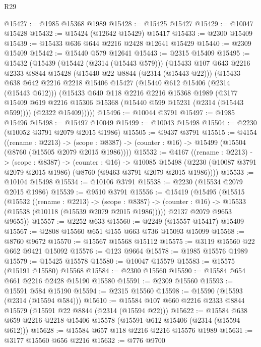 \begin{lexlean}{R29}
\begin{coremodule}
@15427 := @1985 @15368 @1989
@15428 := @15425 @15427
@15429 := @10047 @15428
@15432 := @15424 (@12642 @15429) @15417
@15433 := @2300 @15409
@15439 := @15433 @636 @644 @2216 @2428 @12641 @15429
@15440 := @2309 @15409
@15442 := @15440 @579 @12641
@15443 := @2315 @15409
@15495 := @15432
    (@15439
      (@15442 (@2314 (@15443 @579)))
      (@15433
        @107
        @643
        @2216
        @2333
        @8844
        @15428
        (@15440 @22 @8844 (@2314 (@15443 @22)))
        (@15433
          @638
          @642
          @2216
          @2218
          @15406
          @15427
          (@15440 @612 @15406 (@2314 (@15443 @612)))
          (@15433
            @640
            @118
            @2216
            @2216
            @15368
            @1989
            (@3177 @15409 @619 @2216 @15306 @15368 (@15440 @599 @15231 (@2314 (@15443 @599))))
            (@2322 @15409)))))
@15496 := @10044 @3791
@15497 := @1985 @15496
@15498 := @15497 @10049
@15499 := @10043 @15498
@15504 := @2230 (@10052 @3791 @2079 @2015 @1986)
@15505 := @9437 @3791
@15515 := @4154
    ((rename : @2213) ->
    (scope : @8387) -> (counter : @16) -> @15499 (@15504 (@8760 (@15505 @2079 @2015 @1986))))
@15532 := @4167
    ((rename : @2213) ->
    (scope : @8387) ->
    (counter : @16) ->
    @10085 @15498 (@2230 (@10087 @3791 @2079 @2015 @1986) (@8760 (@9463 @3791 @2079 @2015 @1986))))
@15533 := @10104 @15498
@15534 := @10106 @3791
@15538 := @2230 (@15534 @2079 @2015 @1986)
@15539 := @9510 @3791
@15556 := @15419
    (@15495
      (@15515
        (@15532
          ((rename : @2213) ->
          (scope : @8387) ->
          (counter : @16) -> @15533 (@15538 (@10118 (@15539 @2079 @2015 @1986)))))
        @2137
        @2079
        @9653
        @9655))
@15557 := @2252 @633
@15560 := @2249 (@15557 @15417) @15409
@15567 := @2808 @15560 @651 @155 @663 @736 @15093 @15099
@15568 := @8760 @9672
@15570 := @15567 @15568 @15112
@15575 := @3119 @15560 @22 @662 @9421 @15092
@15576 := @123 @9664
@15578 := @1985 @15576 @1989
@15579 := @15425 @15578
@15580 := @10047 @15579
@15583 := @15575 (@15191 @15580) @15568
@15584 := @2300 @15560
@15590 := @15584 @654 @661 @2216 @2428 @15190 @15580
@15591 := @2309 @15560
@15593 := @15591 @584 @15190
@15594 := @2315 @15560
@15598 := @15590 (@15593 (@2314 (@15594 @584)))
@15610 := @15584 @107 @660 @2216 @2333 @8844 @15579 (@15591 @22 @8844 (@2314 (@15594 @22)))
@15622 := @15584 @638 @659 @2216 @2218 @15406 @15578 (@15591 @612 @15406 (@2314 (@15594 @612)))
@15628 := @15584 @657 @118 @2216 @2216 @15576 @1989
@15631 := @3177 @15560 @656 @2216
@15632 := @776 @9700

\end{coremodule}
\end{lexlean}
